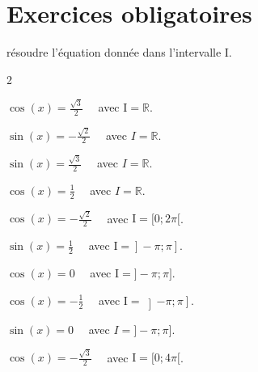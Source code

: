 \documentclass[11pt,a4paper]{article}  %
\begin{document}
	\graphicspath{{images/}}
	
	\begin{center}
		
		
	\end{center}

\section*{Exercices obligatoires}


\exercice{}

résoudre l'équation donnée dans l'intervalle I.

\begin{multicols}{2}
	\begin{enumMet}
	\item $\cos (x)=\frac{\sqrt{3}}{2} \quad$ avec $\mathrm{I}=\mathbb{R}$.
	\item $\sin (x)=-\frac{\sqrt{2}}{2} \quad$ avec $I=\mathbb{R}$.
	\item $\sin (x)=\frac{\sqrt{3}}{2} \quad$ avec $I=\mathbb{R}$.
	\item $\cos (x)=\frac{1}{2} \quad$ avec $I=\mathbb{R}$.
	\item $\cos (x)=-\frac{\sqrt{2}}{2} \quad$ avec $\mathrm{I}=[0 ; 2 \pi[$.
	\item $\sin (x)=\frac{1}{2} \quad$ avec $\left.\left.\mathrm{I}=\right]-\pi ; \pi\right]$.
	\item $\cos (x)=0 \quad$ avec $\mathrm{I}=]-\pi ; \pi]$.
	\item $\cos (x)=-\frac{1}{2} \quad$ avec $\mathrm{I}=\left]-\pi ; \pi\right]$.
	\item $\sin (x)=0 \quad$ avec $I=]-\pi ; \pi]$.
	\item $\cos (x)=-\frac{\sqrt{3}}{2} \quad$ avec $\mathrm{I}=[0 ; 4 \pi[$.
\end{enumMet}
\end{multicols}
\end{document}
